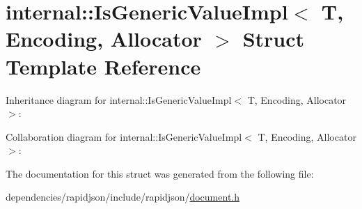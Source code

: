 \hypertarget{structinternal_1_1_is_generic_value_impl}{}\section{internal\+:\+:Is\+Generic\+Value\+Impl$<$ T, Encoding, Allocator $>$ Struct Template Reference}
\label{structinternal_1_1_is_generic_value_impl}


Inheritance diagram for internal\+:\+:Is\+Generic\+Value\+Impl$<$ T, Encoding, Allocator $>$\+:


Collaboration diagram for internal\+:\+:Is\+Generic\+Value\+Impl$<$ T, Encoding, Allocator $>$\+:


The documentation for this struct was generated from the following file\+:\begin{DoxyCompactItemize}
\item 
dependencies/rapidjson/include/rapidjson/\hyperlink{document_8h}{document.\+h}\end{DoxyCompactItemize}
